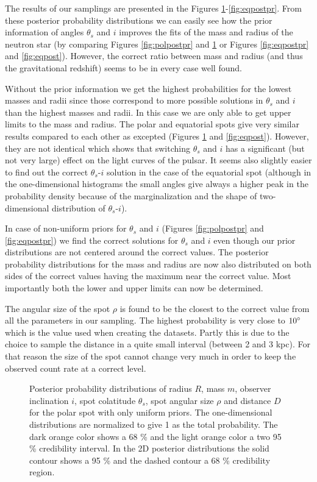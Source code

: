\documentclass{wihuri}
\def\thetas{\theta_{s}}
\begin{document}
The results of our samplings are presented in the Figures \ref{fig:polpost}-\ref{fig:eqpostpr}. From these posterior probability distributions we can easily see how the prior information of angles $\thetas$ and $i$ improves the fits of the mass and radius of the neutron star (by comparing Figures \ref{fig:polpostpr} and \ref{fig:polpost} or Figures \ref{fig:eqpostpr} and \ref{fig:eqpost}). However, the correct ratio between mass and radius (and thus the gravitational redshift) seems to be in every case well found.

Without the prior information we get the highest probabilities for the lowest masses and radii since those correspond to more possible solutions in  $\thetas$ and $i$ than the highest masses and radii. In this case we are only able to get upper limits to the mass and radius. The polar and equatorial spots give very similar results compared to each other as excepted (Figures \ref{fig:polpost} and \ref{fig:eqpost}). However, they are not identical which shows that switching $\thetas$ and $i$ has a significant (but not very large) effect on the light curves of the pulsar. It seems also slightly easier to find out the correct $\thetas$-$i$ solution  in the case of the equatorial spot (although in the one-dimensional histograms the small angles give always a higher peak in the probability density because of the marginalization and the shape of two-dimensional distribution of $\thetas$-$i$). 

In case of non-uniform priors for $\thetas$ and $i$ (Figures \ref{fig:polpostpr} and \ref{fig:eqpostpr}) we find the correct solutions for $\thetas$ and $i$ even though our prior distributions are not centered  around the correct values. The posterior probability distributions for the mass and radius are now also distributed on both sides of the correct values having the maximum near the correct value. Most importantly both the lower and upper limits can now be determined.

The angular size of the spot $\rho$ is found to be the closest to the correct value from all the  parameters in our sampling. The highest probability is very close to $10 \degree$ which is the value used when creating the datasets. Partly this is due to the choice to sample the distance in a quite small interval (between 2 and 3 kpc). For that reason the size of the spot cannot change very much in order to keep the observed count rate at a correct level. 



\begin{figure}
\centerline{}
\caption{Posterior probability distributions of radius $R$, mass $m$, observer inclination $i$, spot colatitude $\thetas$, spot angular size $\rho$ and distance $D$ for the polar spot with only uniform priors. The one-dimensional distributions are normalized to give 1 as the total probability. The dark orange color shows a 68 \% and the light orange color a two 95 \% credibility interval. In the 2D posterior distributions the solid contour shows a 95 \% and the dashed contour a 68 \% credibility region.  
\label{fig:polpost}}
\end{figure}
\end{document}
